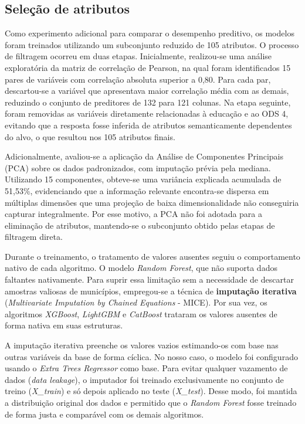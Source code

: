\subsection{Seleção de atributos}

Como experimento adicional para comparar o desempenho preditivo, os modelos foram treinados utilizando um subconjunto reduzido de 105 atributos. O processo de filtragem ocorreu em duas etapas. Inicialmente, realizou-se uma análise exploratória da matriz de correlação de Pearson, na qual foram identificados 15 pares de variáveis com correlação absoluta superior a 0,80. Para cada par, descartou-se a variável que apresentava maior correlação média com as demais, reduzindo o conjunto de preditores de 132 para 121 colunas. Na etapa seguinte, foram removidas as variáveis diretamente relacionadas à educação e ao ODS 4, evitando que a resposta fosse inferida de atributos semanticamente dependentes do alvo, o que resultou nos 105 atributos finais.

Adicionalmente, avaliou-se a aplicação da Análise de Componentes Principais (PCA) sobre os dados padronizados, com imputação prévia pela mediana. Utilizando 15 componentes, obteve-se uma variância explicada acumulada de 51,53\%, evidenciando que a informação relevante encontra-se dispersa em múltiplas dimensões que uma projeção de baixa dimensionalidade não conseguiria capturar integralmente. Por esse motivo, a PCA não foi adotada para a eliminação de atributos, mantendo-se o subconjunto obtido pelas etapas de filtragem direta.

Durante o treinamento, o tratamento de valores ausentes seguiu o comportamento nativo de cada algoritmo. O modelo \textit{Random Forest}, que não suporta dados faltantes nativamente. Para suprir essa limitação sem a necessidade de descartar amostras valiosas de municípios, empregou-se a técnica de \textbf{imputação iterativa} (\textit{Multivariate Imputation by Chained Equations} - MICE). Por sua vez, os algoritmos \textit{XGBoost}, \textit{LightGBM} e \textit{CatBoost} trataram os valores ausentes de forma nativa em suas estruturas.

A imputação iterativa preenche os valores vazios estimando-os com base nas outras variáveis da base de forma cíclica. No nosso caso, o modelo foi configurado usando o \textit{Extra Trees Regressor} como base. Para evitar qualquer vazamento de dados (\textit{data leakage}), o imputador foi treinado exclusivamente no conjunto de treino (\textit{X\_train}) e só depois aplicado no teste (\textit{X\_test}). Desse modo, foi mantida a distribuição original dos dados e permitido que o \textit{Random Forest} fosse treinado de forma justa e comparável com os demais algoritmos.

